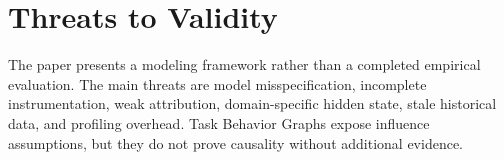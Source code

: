 \section{Threats to Validity}
\label{sec:threats-to-validity}

The paper presents a modeling framework rather than a completed empirical
evaluation. The main threats are model misspecification, incomplete
instrumentation, weak attribution, domain-specific hidden state, stale
historical data, and profiling overhead. Task Behavior Graphs expose influence
assumptions, but they do not prove causality without additional evidence.
